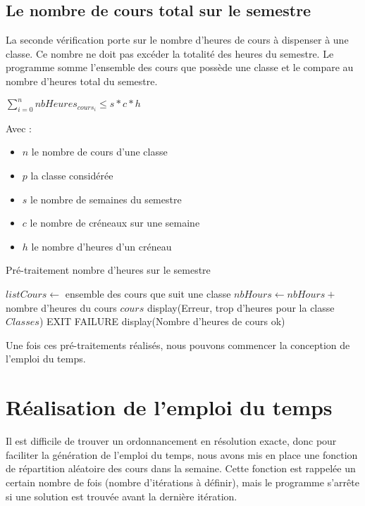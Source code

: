 \documentclass[12pt,a4paper,french]{article}
\begin{document}
\newpage

\subsection{Le nombre de cours total sur le semestre}
La seconde vérification porte sur le nombre d'heures de cours à dispenser à une classe. Ce nombre ne doit pas excéder la totalité des heures du semestre. Le programme somme l'ensemble des cours que possède une classe et le compare au nombre d'heures total du semestre.

\begin{center}
$\sum_{i=0}^n nbHeures_{cours_i} \leq s*c*h$
\end{center}

Avec :\\
\begin{itemize}
\item $n$ le nombre de cours d'une classe
\item $p$ la classe considérée
\item $s$ le nombre de semaines du semestre
\item $c$ le nombre de créneaux sur une semaine
\item $h$ le nombre d'heures d'un créneau
\end{itemize}

\begin{algorithm}
\caption{Pré-traitement nombre d'heures sur le semestre}
\begin{algorithmic}
\STATE $listCours \leftarrow$ ensemble des cours que suit une classe
\STATE $nbHours \leftarrow nbHours +$ nombre d'heures du cours $cours$
\ENDFOR
{}
\STATE display(Erreur, trop d'heures pour la classe $Classes$)
\STATE EXIT FAILURE
\ENDIF
\ENDFOR
\STATE display(Nombre d'heures de cours ok)
\end{algorithmic}
\end{algorithm}

Une fois ces pré-traitements réalisés, nous pouvons commencer la conception de l'emploi du temps.

\newpage
\section{Réalisation de l'emploi du temps}
Il est difficile de trouver un ordonnancement en résolution exacte, donc pour faciliter la génération de l'emploi du temps, nous avons mis en place une fonction de répartition aléatoire des cours dans la semaine. Cette fonction est rappelée un certain nombre de fois (nombre d'itérations à définir), mais le programme s'arrête si une solution est trouvée avant la dernière itération.\\
\end{document}
